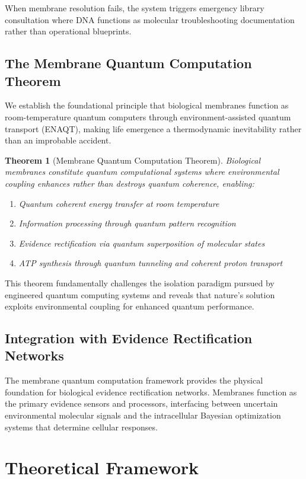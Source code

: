 \documentclass[12pt,a4paper]{article}
\newtheorem{theorem}{Theorem}
\begin{document}
When membrane resolution fails, the system triggers emergency library consultation where DNA functions as molecular troubleshooting documentation rather than operational blueprints.

\subsection{The Membrane Quantum Computation Theorem}

We establish the foundational principle that biological membranes function as room-temperature quantum computers through environment-assisted quantum transport (ENAQT), making life emergence a thermodynamic inevitability rather than an improbable accident.

\begin{theorem}[Membrane Quantum Computation Theorem]
Biological membranes constitute quantum computational systems where environmental coupling enhances rather than destroys quantum coherence, enabling:
\begin{enumerate}
\item Quantum coherent energy transfer at room temperature
\item Information processing through quantum pattern recognition
\item Evidence rectification via quantum superposition of molecular states
\item ATP synthesis through quantum tunneling and coherent proton transport
\end{enumerate}
\end{theorem}

This theorem fundamentally challenges the isolation paradigm pursued by engineered quantum computing systems and reveals that nature's solution exploits environmental coupling for enhanced quantum performance.

\subsection{Integration with Evidence Rectification Networks}

The membrane quantum computation framework provides the physical foundation for biological evidence rectification networks. Membranes function as the primary evidence sensors and processors, interfacing between uncertain environmental molecular signals and the intracellular Bayesian optimization systems that determine cellular responses.

\section{Theoretical Framework}
\end{document}
